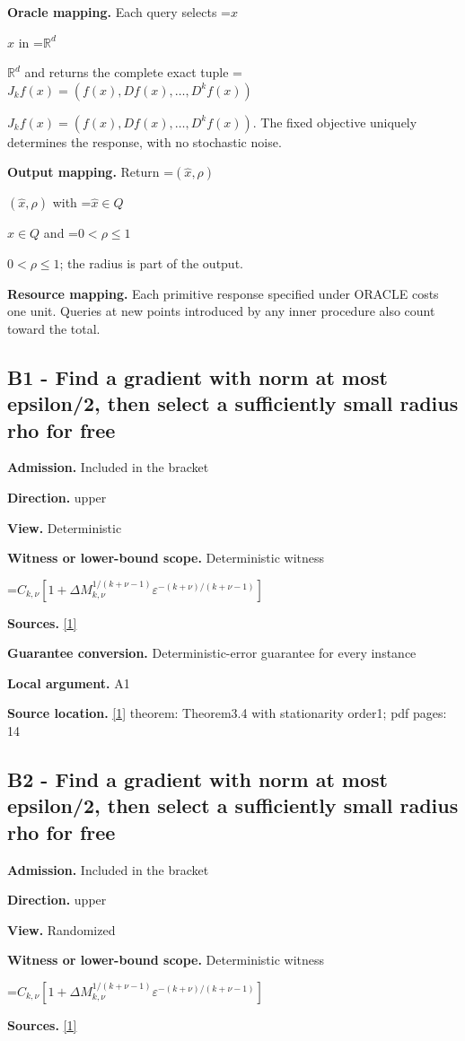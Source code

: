 \documentclass[10pt,a4paper]{article}
\newcommand{\AtlasMath}[1]{\par\begingroup\centering\setbox0=\hbox{$\displaystyle #1$}\ifdim\wd0>1.4\linewidth\typeout{ATLAS WIDE FORMULA: \the\wd0}\fi\ifdim\wd0>\linewidth\resizebox{\linewidth}{!}{\box0}\else\box0\fi\par\endgroup}
\newcommand{\AtlasInlineMath}[1]{\begingroup\setbox0=\hbox{$#1$}\ifdim\wd0>.4\linewidth\endgroup\AtlasMath{#1}\else\endgroup$#1$\fi}
\begin{document}
\textbf{Oracle mapping.} Each query selects \AtlasInlineMath{x} in \AtlasInlineMath{\mathbb{R}^d} and returns the complete exact tuple \AtlasInlineMath{J_{k}f(x)=(f(x),Df(x),\ldots,D^{k}f(x))}. The fixed objective uniquely determines the response, with no stochastic noise.

\textbf{Output mapping.} Return \AtlasInlineMath{(\widehat{x},\rho)} with \AtlasInlineMath{\widehat{x}\in Q} and \AtlasInlineMath{0<\rho\le1}; the radius is part of the output.

\textbf{Resource mapping.} Each primitive response specified under ORACLE costs one unit. Queries at new points introduced by any inner procedure also count toward the total.

\subsection{B1 - Find a gradient with norm at most epsilon/2, then select a sufficiently small radius rho for free}
\textbf{Admission.} Included in the bracket

\textbf{Direction.} upper

\textbf{View.} Deterministic

\textbf{Witness or lower-bound scope.} Deterministic witness

\AtlasMath{C_{k,\nu}[1+\Delta M_{k,\nu}^{1/(k+\nu-1)}\varepsilon^{-(k+\nu)/(k+\nu-1)}]}
\textbf{Sources.} \href{https://arxiv.org/abs/1811.01220}{[1]}

\textbf{Guarantee conversion.} Deterministic-error guarantee for every instance

\textbf{Local argument.} A1

\textbf{Source location.} \href{https://arxiv.org/abs/1811.01220}{[1]} theorem: Theorem3.4 with stationarity order1; pdf pages: 14

\subsection{B2 - Find a gradient with norm at most epsilon/2, then select a sufficiently small radius rho for free}
\textbf{Admission.} Included in the bracket

\textbf{Direction.} upper

\textbf{View.} Randomized

\textbf{Witness or lower-bound scope.} Deterministic witness

\AtlasMath{C_{k,\nu}[1+\Delta M_{k,\nu}^{1/(k+\nu-1)}\varepsilon^{-(k+\nu)/(k+\nu-1)}]}
\textbf{Sources.} \href{https://arxiv.org/abs/1811.01220}{[1]}
\end{document}
